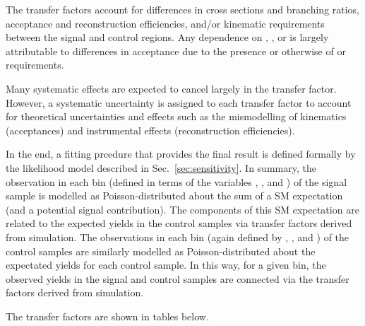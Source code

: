 The transfer factors account for differences in cross sections and
branching ratios, acceptance and reconstruction efficiencies, and/or
kinematic requirements between the signal and control regions. Any
dependence on \njet, \nb, or \HT is largely attributable to
differences in acceptance due to the presence or otherwise of \alphat
or \mht requirements.

Many systematic effects are expected to cancel largely in the transfer
factor. However, a systematic uncertainty is assigned to each transfer
factor to account for theoretical uncertainties and effects such as
the mismodelling of kinematics (\eg acceptances) and instrumental
effects (\eg reconstruction efficiencies).

In the end, a fitting prcedure that provides the final result is
defined formally by the likelihood model described in
Sec.~\ref{sec:sensitivity}. In summary, the observation in each bin
(defined in terms of the variables \njet, \nb, and \scalht) of the
signal sample is modelled as Poisson-distributed about the sum of a SM
expectation (and a potential signal contribution). The components of
this SM expectation are related to the expected yields in the control
samples via transfer factors derived from simulation. The observations
in each bin (again defined by \njet, \nb, and \scalht) of the control
samples are similarly modelled as Poisson-distributed about the
expectated yields for each control sample. In this way, for a given
bin, the observed yields in the signal and control samples are
connected via the transfer factors derived from simulation. 



The transfer factors are shown in tables below.

